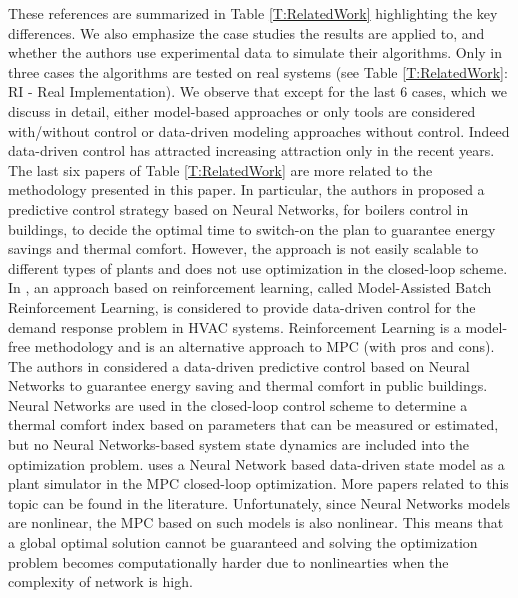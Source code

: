 \textcolor[rgb]{0,0,1}{
These references are summarized in Table \ref{T:RelatedWork} highlighting the key differences.
We also emphasize the case studies the results are applied to, and whether the authors use experimental data to simulate their algorithms.
Only in three cases the algorithms are tested on real systems (see Table \ref{T:RelatedWork}: RI - Real Implementation).
We observe that except for the last 6 cases, which we discuss in detail, either model-based approaches or only tools are considered with/without control or data-driven modeling approaches without control.
Indeed data-driven control has attracted increasing attraction only in the recent years.
The last six papers of Table \ref{T:RelatedWork} are more related to the methodology presented in this paper.
In particular, the authors in \cite{Macarulla2017} proposed a predictive control strategy based on Neural Networks, for boilers control in buildings, to decide the optimal time to switch-on the plan to guarantee energy savings and thermal comfort.
However, the approach is not easily scalable to different types of plants and does not use optimization in the closed-loop scheme.
In \cite{Costanzo2016}, an approach based on reinforcement learning, called Model-Assisted Batch Reinforcement Learning, is considered to provide data-driven control for the demand response problem in HVAC systems.
Reinforcement Learning is a model-free methodology and is an alternative approach to MPC \cite{Ernst2009TSMC} (with pros and cons).
The authors in \cite{Ferreira2012}considered a data-driven predictive control based on Neural Networks to guarantee energy saving and  thermal comfort in public buildings.
Neural Networks are used in the closed-loop control scheme to determine a thermal comfort index based on parameters that can be measured or estimated, but no Neural Networks-based system state dynamics are included into the optimization problem.
\cite{Afram2017} uses a Neural Network based data-driven state model as a plant simulator in the MPC closed-loop optimization.
More papers related to this topic can be found in the literature.
Unfortunately, since Neural Networks models are nonlinear, the MPC based on such models is also nonlinear.
This means that a global optimal solution cannot be guaranteed and solving the optimization problem becomes computationally harder due to nonlinearties when the complexity of network is high.
}

